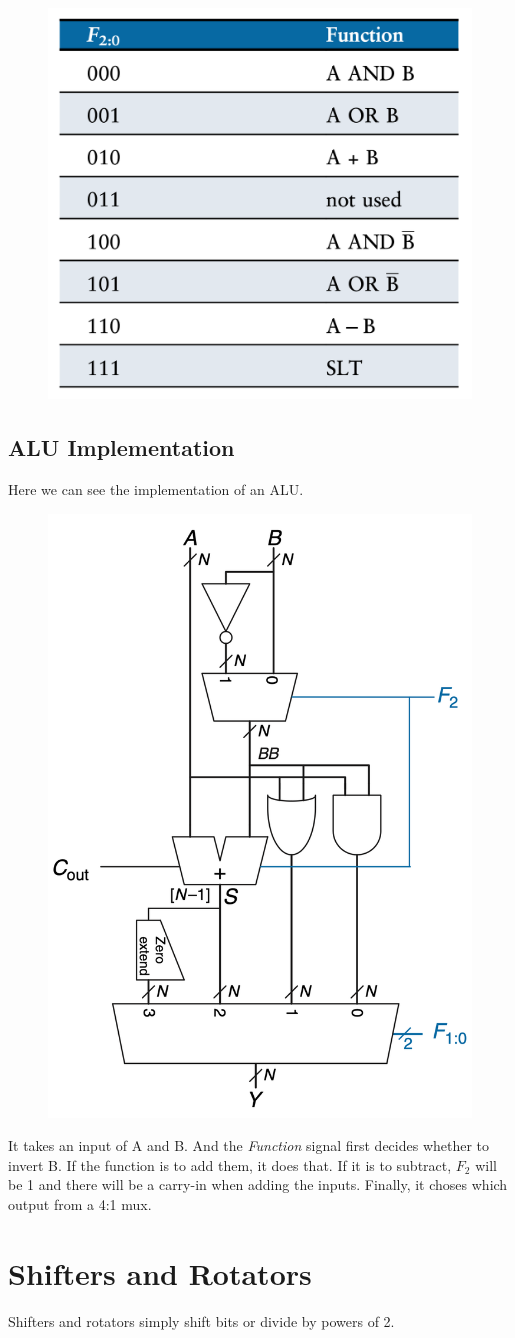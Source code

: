 \documentclass[12pt]{report}
\begin{document}
\begin{figure}[H]
  \centering
  \includegraphics[width=.4\textwidth]{ALU-functions.png}
\end{figure}

\pagebreak

\subsection{ALU Implementation}

Here we can see the implementation of an ALU.

\begin{figure}[h!]
  \centering
  \includegraphics[width=.5\textwidth]{ALU-implementation.png}
\end{figure}

It takes an input of A and B. And the \textit{Function} signal first decides whether to invert B. 
If the function is to add them, it does that. If it is to subtract, $F_2$ will be 1 and there will be a carry-in
when adding the inputs. Finally, it choses which output from a 4:1 mux.  
\pagebreak
\section{Shifters and Rotators}
Shifters and rotators simply shift bits or divide by powers of 2. 
\end{document}
